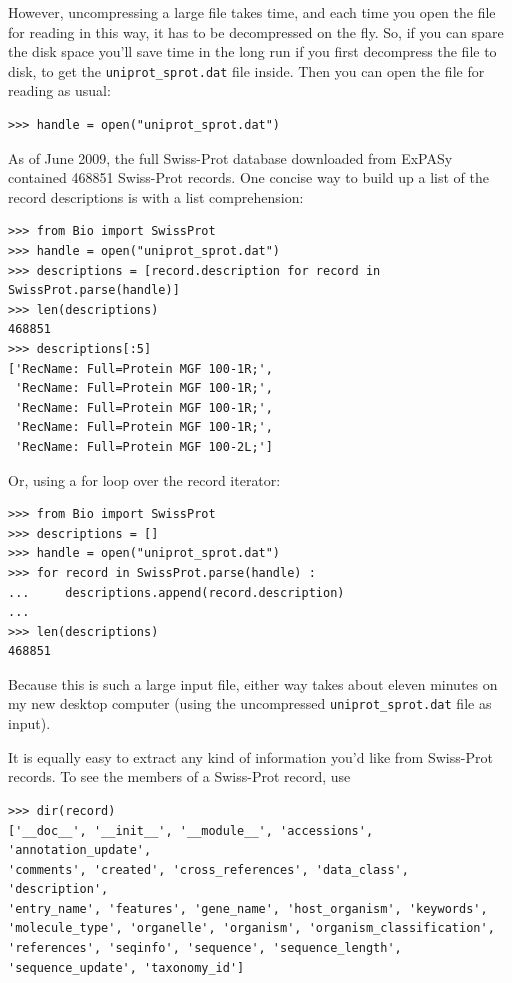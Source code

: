 \documentclass{report}
\begin{document}
However, uncompressing a large file takes time, and each time you open the file for reading in this way, it has to be decompressed on the fly.  So, if you can spare the disk space you'll save time in the long run if you first decompress the file to disk, to get the \verb|uniprot_sprot.dat| file inside.  Then you can open the file for reading as usual:

\begin{verbatim}
>>> handle = open("uniprot_sprot.dat")
\end{verbatim}

As of June 2009, the full Swiss-Prot database downloaded from ExPASy contained 468851 Swiss-Prot records.  One concise way to build up a list of the record descriptions is with a list comprehension: 
\begin{verbatim}
>>> from Bio import SwissProt
>>> handle = open("uniprot_sprot.dat")
>>> descriptions = [record.description for record in SwissProt.parse(handle)]
>>> len(descriptions)
468851
>>> descriptions[:5]
['RecName: Full=Protein MGF 100-1R;',
 'RecName: Full=Protein MGF 100-1R;',
 'RecName: Full=Protein MGF 100-1R;',
 'RecName: Full=Protein MGF 100-1R;',
 'RecName: Full=Protein MGF 100-2L;']

\end{verbatim}

Or, using a for loop over the record iterator:
\begin{verbatim}
>>> from Bio import SwissProt
>>> descriptions = []
>>> handle = open("uniprot_sprot.dat")
>>> for record in SwissProt.parse(handle) :
...     descriptions.append(record.description)
...
>>> len(descriptions)
468851
\end{verbatim}

Because this is such a large input file, either way takes about eleven minutes on my new desktop computer (using the uncompressed \verb|uniprot_sprot.dat| file as input).

It is equally easy to extract any kind of information you'd like from Swiss-Prot records. To see the members of a Swiss-Prot record, use
\begin{verbatim}
>>> dir(record)
['__doc__', '__init__', '__module__', 'accessions', 'annotation_update',
'comments', 'created', 'cross_references', 'data_class', 'description',
'entry_name', 'features', 'gene_name', 'host_organism', 'keywords',
'molecule_type', 'organelle', 'organism', 'organism_classification',
'references', 'seqinfo', 'sequence', 'sequence_length',
'sequence_update', 'taxonomy_id']
\end{verbatim}
\end{document}
